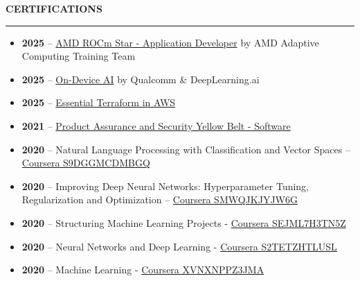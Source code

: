 \documentclass{resume} %
\renewenvironment{rSection}[1]{ %
  \sectionskip
  \textcolor{primaryColor}{\MakeUppercase{\bf #1}} %
  \sectionlineskip
  {\color{primaryColor}\hrule} %
  \begin{list}{}{ %
    \setlength{\leftmargin}{1.5em} %
  }
  \item[]
}{
  \end{list}
}
\begin{document}
\begin{rSection}{Certifications}

\begin{itemize}
    \item \textbf{2025} -- \href{https://learning.amd.com/certs/11279/95A05A0CC78443498F47FD0FDB6188FC65062.pdf}{AMD ROCm Star - Application Developer} by AMD Adaptive Computing Training Team
    \item \textbf{2025} -- \href{https://learn.deeplearning.ai/accomplishments/f4188f58-c075-45f4-b2c8-6b6318c51ceb?usp=sharing}{On-Device AI} by Qualcomm \& DeepLearning.ai
    \item \textbf{2025} -- \href{https://www.linkedin.com/learning/certificates/bfa1f8149f171120da54a209a31361de4ac56fe1e3f167e2cbc8cd9fd7ca38d1?u=2140730}{Essential Terraform in AWS}
    \item \textbf{2021} -- \href{https://www.credly.com/badges/a3861155-a2e2-43d5-a8dd-cc21651c5841?source=linked_in_profile}{Product Assurance and Security Yellow Belt - Software}
    \item \textbf{2020} -- Natural Language Processing with Classification and Vector Spaces -- \href{https://coursera.org/verify/S9DGGMCDMBGQ}{Coursera S9DGGMCDMBGQ}
    \item \textbf{2020} -- Improving Deep Neural Networks: Hyperparameter Tuning, Regularization and Optimization -- \href{https://coursera.org/verify/SMWQJKJYJW6G}{Coursera SMWQJKJYJW6G}
    \item \textbf{2020} -- Structuring Machine Learning Projects - \href{https://coursera.org/verify/SEJML7H3TN5Z}{Coursera SEJML7H3TN5Z}
    \item \textbf{2020} -- Neural Networks and Deep Learning - \href{https://coursera.org/verify/S2TETZHTLUSL}{Coursera S2TETZHTLUSL}
    \item \textbf{2020} -- Machine Learning - \href{https://coursera.org/verify/XVNXNPPZ3JMA}{Coursera XVNXNPPZ3JMA}
\end{itemize}

\end{rSection}
\end{document}
